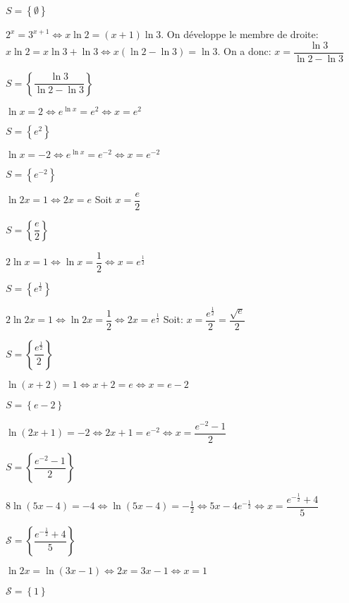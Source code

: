 \documentclass[a4paper,12pt]{scrartcl}
\begin{document}
$S = \left\lbrace \emptyset \right\rbrace$

\question{}
$2^x = 3^{x+1} \Leftrightarrow x \ln 2 = (x+1) \ln 3$. On développe le membre de droite: $x \ln 2 = x \ln 3 + \ln 3 \Leftrightarrow x (\ln 2 - \ln 3) = \ln 3$. On a donc: $x = \dfrac{\ln 3}{\ln 2 - \ln 3}$

$S = \left\lbrace \dfrac{\ln 3}{\ln 2 - \ln 3} \right\rbrace$

\exo{}

\question{}
$\ln x = 2 \Leftrightarrow e^{\ln x} = e^2 \Leftrightarrow x = e^2$

$S = \left\lbrace e^2 \right\rbrace$

\question{}
$\ln x = -2 \Leftrightarrow e^{\ln x} = e^{-2} \Leftrightarrow x = e^{-2}$

$S = \left\lbrace e^{-2} \right\rbrace$

\question{}
$\ln 2x = 1 \Leftrightarrow 2x = e$ Soit $x = \dfrac{e}{2}$

$S = \left\lbrace \dfrac{e}{2} \right\rbrace$

\question{}
$2 \ln x = 1 \Leftrightarrow \ln x = \dfrac{1}{2} \Leftrightarrow x = e^{\frac{1}{2}}$

$S = \left\lbrace e^{\frac{1}{2}} \right\rbrace$

\question{}
$2 \ln 2x = 1 \Leftrightarrow \ln 2x = \dfrac{1}{2} \Leftrightarrow 2x = e^{\frac{1}{2}}$ Soit: $x = \dfrac{e^{\frac{1}{2}}}{2} = \dfrac{\sqrt{e}}{2}$

$S = \left\lbrace \dfrac{e^{\frac{1}{2}}}{2} \right\rbrace$

\question{}
$\ln(x+2) = 1 \Leftrightarrow x+2 = e \Leftrightarrow x = e-2$

$S = \left\lbrace e-2 \right\rbrace$

\question{}
$\ln(2x +1) = -2 \Leftrightarrow 2x+1 = e^{-2} \Leftrightarrow x = \dfrac{e^{-2} - 1}{2}$

$S = \left\lbrace \dfrac{e^{-2} - 1}{2} \right\rbrace$

\question{}
$8 \ln (5x-4) = -4 \Leftrightarrow \ln (5x-4) = -\frac{1}{2} \Leftrightarrow 5x-4 e^{-\frac{1}{2}} \Leftrightarrow x = \dfrac{e^{-\frac{1}{2}}+4}{5}$

$\mathcal{S} = \left\{\dfrac{e^{-\frac{1}{2}}+4}{5}\right\}$

\question{}
$\ln 2x = \ln(3x-1) \Leftrightarrow 2x = 3x-1 \Leftrightarrow x=1$

$\mathcal{S} = \left\{1\right\}$

\end{document}
